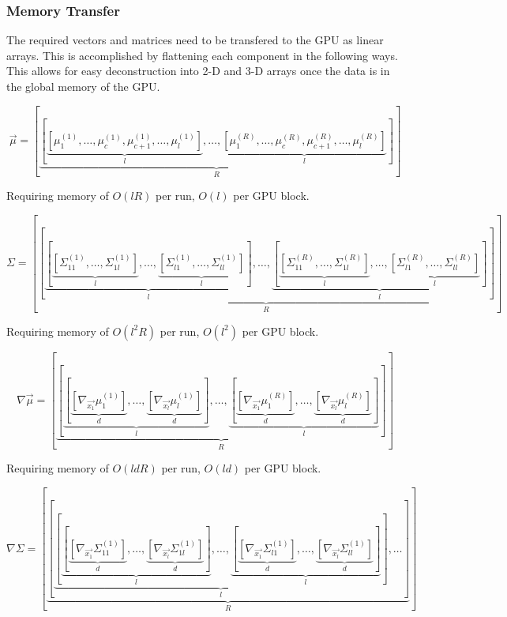 \documentclass[phd,tocprelim]{cornell}
\begin{document}
\subsubsection{Memory Transfer} %
\label{ssub:Memory Transfer}

The required vectors and matrices need to be transfered to the GPU as linear arrays. This is accomplished by flattening each component in the following ways. This allows for easy deconstruction into 2-D and 3-D arrays once the data is in the global memory of the GPU.

\begin{equation}
    \vec{\mu} = \left[ \underbrace{\left[ \underbrace{\left[\mu_{1}^{(1)}, \ldots, \mu_{c}^{(1)}, \mu_{c+1}^{(1)}, \ldots, \mu_{l}^{(1)} \right]}_{l}, \ldots, \underbrace{\left[\mu_{1}^{(R)}, \ldots, \mu_{c}^{(R)}, \mu_{c+1}^{(R)}, \ldots, \mu_{l}^{(R)} \right]}_{l} \right]}_{R} \right]
\end{equation}

Requiring memory of $O(lR)$ per run, $O(l)$ per GPU block.

\begin{equation}
    \Sigma = \left[ \underbrace{ \left[ \underbrace{ \left[ \underbrace{ \left[ \Sigma_{11}^{(1)}, \ldots, \Sigma_{1l}^{(1)} \right]}_{l}, \ldots, \underbrace{ \left[ \Sigma_{l1}^{(1)}, \ldots, \Sigma_{ll}^{(1)} \right]}_{l} \right] }_{l}, \ldots, \underbrace{ \left[ \underbrace{ \left[ \Sigma_{11}^{(R)}, \ldots, \Sigma_{1l}^{(R)} \right]}_{l}, \ldots, \underbrace{ \left[ \Sigma_{l1}^{(R)}, \ldots, \Sigma_{ll}^{(R)} \right]}_{l} \right] }_{l}  \right]}_{R}\right]
\end{equation}

Requiring memory of $O(l^{2}R)$ per run, $O(l^{2})$ per GPU block.

\begin{equation}
    \nabla \vec{\mu} = \left[ \underbrace{ \left[ \underbrace{ \left[ \underbrace{ \left[ \nabla_{\vec{x_{1}}} \mu_{1}^{(1)} \right]}_{d} , \ldots, \underbrace{ \left[ \nabla_{\vec{x_{l}}} \mu_{l}^{(1)} \right]}_{d}\right]}_{l}, \ldots, \underbrace{ \left[ \underbrace{ \left[ \nabla_{\vec{x_{1}}} \mu_{1}^{(R)} \right]}_{d} , \ldots, \underbrace{ \left[ \nabla_{\vec{x_{l}}} \mu_{l}^{(R)} \right]}_{d}\right]}_{l} \right]}_{R} \right]
\end{equation}

Requiring memory of $O(ldR)$ per run, $O(ld)$ per GPU block.

\begin{equation}
    \nabla \Sigma = \left[ \underbrace{ \left[ \underbrace{ \left[ \underbrace{ \left[ \underbrace{ \left[ \nabla_{\vec{x_{1}}} \Sigma_{11}^{(1)} \right]}_{d} , \ldots, \underbrace{ \left[ \nabla_{\vec{x_{l}}} \Sigma_{1l}^{(1)} \right]}_{d}\right]}_{l}, \ldots, \underbrace{ \left[ \underbrace{ \left[ \nabla_{\vec{x_{1}}} \Sigma_{l1}^{(1)} \right]}_{d} , \ldots, \underbrace{ \left[ \nabla_{\vec{x_{l}}} \Sigma_{ll}^{(1)} \right]}_{d}\right]}_{l} \right] }_{l}, \ldots \right]}_{R} \right]
\end{equation}
\end{document}
